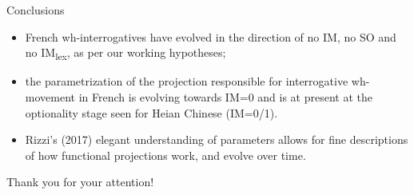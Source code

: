 \documentclass[lesson_slides]{subfiles}
\begin{document}
\begin{frame}[c]{Conclusions}

        \begin{itemize}
        \item[\ding{227}] French wh-interrogatives have evolved in the direction of no IM, no SO and no IM\textsubscript{lex}, as per our working hypotheses; \pause
        \item[\ding{227}] the parametrization of the projection responsible for interrogative wh-movement in French is evolving towards IM=0 and is at present at the optionality stage seen for Heian Chinese (IM=0/1).  \pause
        \item[\ding{227}] \vspace*{-2mm} Rizzi's (2017) elegant understanding of parameters allows for fine descriptions of how functional projections work, and evolve over time.
        \end{itemize}
  
\end{frame}
\begin{frame}[c]{}

\begin{center}
    \huge{Thank you for your attention!}
\end{center}
  
\end{frame}
\end{document}

